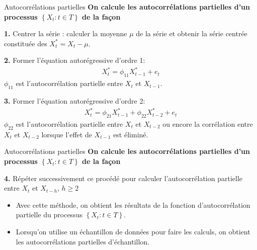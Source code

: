 \documentclass{beamer}
\begin{document}
\begin{frame}{Autocorrélations partielles}
\textbf{On calcule les autocorrélations partielles d’un processus $\left\{ X_t : t \in T \right\}$ de la façon}

\vspace{0.2cm}

\textbf{1.} Centrer la série : calculer la moyenne $\mu$ de la série et obtenir la série centrée constituée des $X_t^*=X_t-\mu$.

\vspace{0.2cm}

\textbf{2.} Former l’équation autorégressive d’ordre 1:
\begin{align*}
X_t^*=\phi_{11} X_{t-1}^*+e_t
\end{align*}
$\phi_{11}$ est l’autocorrélation partielle entre $X_t$ et $X_{t-1}$.

\vspace{0.2cm}

\textbf{3.} Former l’équation autorégressive d’ordre 2:
\begin{align*}
X_t^*=\phi_{21} X_{t-1}^*+\phi_{22} X_{t-2}^*+e_t
\end{align*}
$\phi_{22}$ est l’autocorrélation partielle entre $X_t$ et $X_{t-2}$ ou encore la corrélation entre $X_t$ et $X_{t-2}$ lorsque l'effet de $X_{t-1}$ est éliminé.

\end{frame}


\begin{frame}{Autocorrélations partielles}
\textbf{On calcule les autocorrélations partielles d’un processus $\left\{ X_t : t \in T \right\}$ de la façon}

\vspace{0.2cm}

\textbf{4.} Répéter successivement ce procédé pour calculer l’autocorrélation partielle entre $X_t$ et $X_{t-h}$, $h \geq 2$


\begin{itemize}
\item Avec cette méthode, on obtient les résultats de la fonction d’autocorrélation partielle du processus $\left\{ X_t : t \in T \right\}$. 
\item Lorsqu’on utilise un échantillon de données pour faire les calculs, on obtient les autocorrélations partielles d’échantillon.
\end{itemize}

\end{frame}
\end{document}

